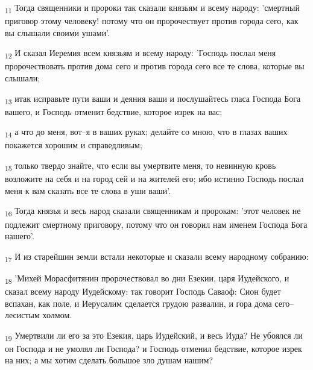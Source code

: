 \begin{tcolorbox}
\textsubscript{11} Тогда священники и пророки так сказали князьям и всему народу: 'смертный приговор этому человеку! потому что он пророчествует против города сего, как вы слышали своими ушами'.
\end{tcolorbox}
\begin{tcolorbox}
\textsubscript{12} И сказал Иеремия всем князьям и всему народу: 'Господь послал меня пророчествовать против дома сего и против города сего все те слова, которые вы слышали;
\end{tcolorbox}
\begin{tcolorbox}
\textsubscript{13} итак исправьте пути ваши и деяния ваши и послушайтесь гласа Господа Бога вашего, и Господь отменит бедствие, которое изрек на вас;
\end{tcolorbox}
\begin{tcolorbox}
\textsubscript{14} а что до меня, вот--я в ваших руках; делайте со мною, что в глазах ваших покажется хорошим и справедливым;
\end{tcolorbox}
\begin{tcolorbox}
\textsubscript{15} только твердо знайте, что если вы умертвите меня, то невинную кровь возложите на себя и на город сей и на жителей его; ибо истинно Господь послал меня к вам сказать все те слова в уши ваши'.
\end{tcolorbox}
\begin{tcolorbox}
\textsubscript{16} Тогда князья и весь народ сказали священникам и пророкам: 'этот человек не подлежит смертному приговору, потому что он говорил нам именем Господа Бога нашего'.
\end{tcolorbox}
\begin{tcolorbox}
\textsubscript{17} И из старейшин земли встали некоторые и сказали всему народному собранию:
\end{tcolorbox}
\begin{tcolorbox}
\textsubscript{18} 'Михей Морасфитянин пророчествовал во дни Езекии, царя Иудейского, и сказал всему народу Иудейскому: так говорит Господь Саваоф: Сион будет вспахан, как поле, и Иерусалим сделается грудою развалин, и гора дома сего--лесистым холмом.
\end{tcolorbox}
\begin{tcolorbox}
\textsubscript{19} Умертвили ли его за это Езекия, царь Иудейский, и весь Иуда? Не убоялся ли он Господа и не умолял ли Господа? и Господь отменил бедствие, которое изрек на них; а мы хотим сделать большое зло душам нашим?
\end{tcolorbox}
